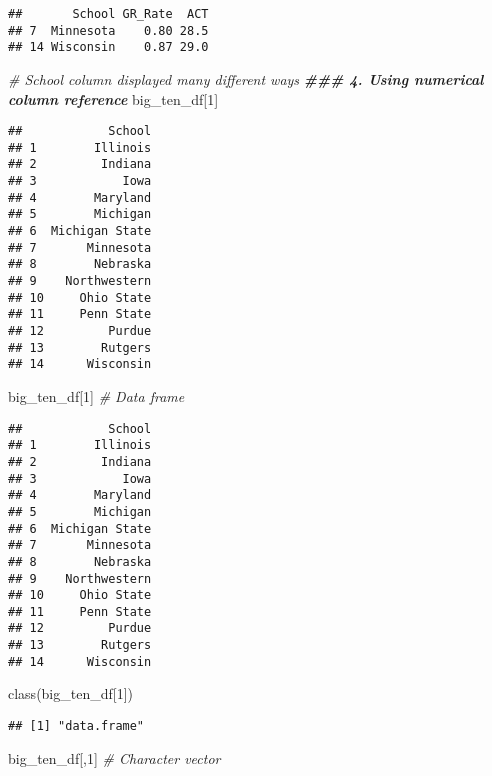 \documentclass[
]{article}
\newenvironment{Shaded}{\begin{snugshade}}{\end{snugshade}}
\newcommand{\CommentTok}[1]{\textcolor[rgb]{0.56,0.35,0.01}{\textit{#1}}}
\newcommand{\DecValTok}[1]{\textcolor[rgb]{0.00,0.00,0.81}{#1}}
\newcommand{\DocumentationTok}[1]{\textcolor[rgb]{0.56,0.35,0.01}{\textbf{\textit{#1}}}}
\newcommand{\FunctionTok}[1]{\textcolor[rgb]{0.00,0.00,0.00}{#1}}
\newcommand{\NormalTok}[1]{#1}
\begin{document}
\begin{verbatim}
##       School GR_Rate  ACT
## 7  Minnesota    0.80 28.5
## 14 Wisconsin    0.87 29.0
\end{verbatim}

\begin{Shaded}
\begin{Highlighting}[]
\CommentTok{\# School column displayed many different ways}
\DocumentationTok{\#\#\# 4. Using numerical column reference}
\NormalTok{big\_ten\_df[}\DecValTok{1}\NormalTok{]}
\end{Highlighting}
\end{Shaded}

\begin{verbatim}
##            School
## 1        Illinois
## 2         Indiana
## 3            Iowa
## 4        Maryland
## 5        Michigan
## 6  Michigan State
## 7       Minnesota
## 8        Nebraska
## 9    Northwestern
## 10     Ohio State
## 11     Penn State
## 12         Purdue
## 13        Rutgers
## 14      Wisconsin
\end{verbatim}

\begin{Shaded}
\begin{Highlighting}[]
\NormalTok{big\_ten\_df[}\DecValTok{1}\NormalTok{]     }\CommentTok{\# Data frame}
\end{Highlighting}
\end{Shaded}

\begin{verbatim}
##            School
## 1        Illinois
## 2         Indiana
## 3            Iowa
## 4        Maryland
## 5        Michigan
## 6  Michigan State
## 7       Minnesota
## 8        Nebraska
## 9    Northwestern
## 10     Ohio State
## 11     Penn State
## 12         Purdue
## 13        Rutgers
## 14      Wisconsin
\end{verbatim}

\begin{Shaded}
\begin{Highlighting}[]
\FunctionTok{class}\NormalTok{(big\_ten\_df[}\DecValTok{1}\NormalTok{])}
\end{Highlighting}
\end{Shaded}

\begin{verbatim}
## [1] "data.frame"
\end{verbatim}

\begin{Shaded}
\begin{Highlighting}[]
\NormalTok{big\_ten\_df[,}\DecValTok{1}\NormalTok{]    }\CommentTok{\# Character vector}
\end{Highlighting}
\end{Shaded}
\end{document}
